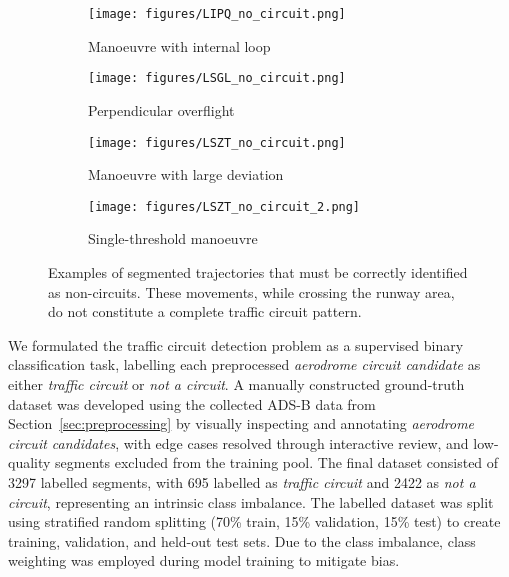 \documentclass[
  manuscript=proceedings,  %
  layout=preprint,         %
  year=2025,
  volume=x,
]{extra/joas}
\begin{document}
\vspace{-1em}
\begin{figure}[ht!]
  \centering
  
  \begin{subfigure}{0.24\textwidth}
    \centering
    \texttt{[image: figures/LIPQ\_no\_circuit.png]}
    \caption{Manoeuvre with internal loop}
    \label{fig:circuit_a}
  \end{subfigure}
  \hfill
  \begin{subfigure}{0.24\textwidth}
    \centering
    \texttt{[image: figures/LSGL\_no\_circuit.png]}
    \caption{Perpendicular overflight}
    \label{fig:circuit_b}
  \end{subfigure}
  \hfill
  \begin{subfigure}{0.25\textwidth}
    \centering
    \texttt{[image: figures/LSZT\_no\_circuit.png]}
    \caption{Manoeuvre with large deviation}
    \label{fig:circuit_c}
  \end{subfigure}
  \hfill
  \begin{subfigure}{0.25\textwidth}
    \centering
    \texttt{[image: figures/LSZT\_no\_circuit\_2.png]}
    \caption{Single-threshold manoeuvre}
    \label{fig:circuit_d}
  \end{subfigure}

  \caption{Examples of segmented trajectories that must be correctly identified as non-circuits. These movements, while crossing the runway area, do not constitute a complete traffic circuit pattern.}
  \label{fig:not_circuits}
\end{figure}

We formulated the traffic circuit detection problem as a supervised binary classification task, labelling each preprocessed \textit{aerodrome circuit candidate} as either \textit{traffic circuit} or \textit{not a circuit}. A manually constructed ground-truth dataset was developed using the collected ADS-B data from Section~\ref{sec:preprocessing} by visually inspecting and annotating \textit{aerodrome circuit candidates}, with edge cases resolved through interactive review, and low-quality segments excluded from the training pool. The final dataset consisted of 3297 labelled segments, with 695 labelled as \textit{traffic circuit} and 2422 as \textit{not a circuit}, representing an intrinsic class imbalance. The labelled dataset was split using stratified random splitting (70\% train, 15\% validation, 15\% test) to create training, validation, and held-out test sets. Due to the class imbalance, class weighting was employed during model training to mitigate bias.
\end{document}
